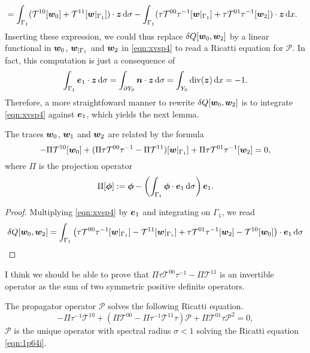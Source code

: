 \documentclass[a4paper,10pt,reqno]{amsart}
\begin{document}
\begin{remark}
\[\begin{aligned}
     &= \int_{\Gamma_1} (\mathcal{T}^{10}[\w_0]+\mathcal{T}^{11}[\w|_{\Gamma_1}])\cdot\z\D
     \sigma -\int_{\Gamma_1}(\tau\mathcal{T}^{00}\tau^{-1}[\w|_{\Gamma_1}] +
     \tau\mathcal{T}^{01}\tau^{-1}[\w_2])\cdot\z\D x.   
    \end{aligned}
\] 
Inserting these expression, we could thus replace $\delta Q[{\bm w}_0,{\bm w}_2]$ by a linear
functional in ${\bm w}_0$, ${\bm w}_{|\Gamma_1}$ and ${\bm w}_2$ in \cref{eqn:xvsp4} to read a
Ricatti equation for $\mathcal{P}$. In fact, this computation is just a consequence
of  
\[
\int_{\Gamma_1}{\bm e}_1 \cdot\bm z \,\mathrm{d} \sigma = \int_{\partial Y_0}{\bm n}\cdot\bm z\,\mathrm{d} \sigma =
\int_{Y_0}\mathrm{div}(\bm z)\,\mathrm{d} x= -1.
\] 
Therefore, a more straightfoward manner to rewrite $\delta Q[{\bm w}_0,{\bm w}_2]$ is to
integrate \cref{eqn:xvsp4} against ${\bm e}_1$, which yields the next lemma.
\end{remark}
\begin{lemma}
    The traces ${\bm w}_0$, ${\bm w}_1$ and ${\bm w}_2$ are related by the formula     
    \begin{equation}
    \label{eqn:ible6}
        -\Pi\mathcal{T}^{10}[\w_0]+(\Pi\tau\mathcal{T}^{00}\tau^{-1}-\Pi\mathcal{T}^{11})[\w|_{\Gamma_1}]+\Pi\tau\mathcal{T}^{01}\tau^{-1}[\w_2]=0,
    \end{equation}
    where   $ \Pi$ is the projection operator 
    \[
        \Pi[{\bm \phi}]:= {\bm \phi}-\left(\int_{\Gamma_1}{\bm \phi}\cdot{\bm e}_1\,\mathrm{d} \sigma\right){\bm e}_1.
    \] 
\end{lemma}
\begin{proof}
    Multiplying \cref{eqn:xvsp4} by ${\bm e}_1$ and integrating on $\Gamma_1$, we read   
    \[
        \delta Q[\w_0,\w_2] = \int_{\Gamma_1}\left( \tau
        \mathcal{T}^{00}\tau^{-1}[\w|_{\Gamma_1}]-\mathcal{T}^{11}[\w|_{\Gamma_1}]+\tau
    \mathcal{T}^{01}\tau^{-1}[\w_2]-\mathcal{T}^{10}[\w_0] \right)\cdot\e_1\D \sigma
    \] 
\end{proof}
   \begin{remark}
    I think we should be able to prove that $\Pi\tau
    \mathcal{T}^{00}\tau^{-1}-\Pi\mathcal{T}^{11}$ is an invertible operator as the
    sum of two symmetric positive definite operators. 
   \end{remark} 
   \begin{corollary}
       The propagator operator $\mathcal{P}$ solves the following Ricatti equation.     
       \begin{equation}
       \label{eqn:1p64i}
        -\Pi\tau^{-1}\mathcal{T}^{10}+(\Pi\mathcal{T}^{00}-\Pi\tau^{-1}\mathcal{T}^{11}\tau)\mathcal{P}+\Pi\mathcal{T}^{01}\tau\mathcal{P}^{2}=0,
       \end{equation}
   $\mathcal{P}$ is the unique operator with
   spectral radius $\sigma<1$ solving the Ricatti equation \cref{eqn:1p64i}.
   \end{corollary}
\end{document}
